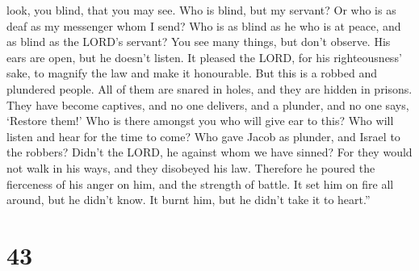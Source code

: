 look, you blind, that you may see.  Who is blind, but my
servant? Or who is as deaf as my messenger whom I send? Who is as blind
as he who is at peace, and as blind as the LORD's servant?
 You see many things, but don't observe. His ears are
open, but he doesn't listen.  It pleased the LORD, for
his righteousness' sake, to magnify the law and make it honourable.
 But this is a robbed and plundered people. All of them
are snared in holes, and they are hidden in prisons. They have become
captives, and no one delivers, and a plunder, and no one says, `Restore
them!'  Who is there amongst you who will give ear to
this? Who will listen and hear for the time to come?  Who
gave Jacob as plunder, and Israel to the robbers? Didn't the LORD, he
against whom we have sinned? For they would not walk in his ways, and
they disobeyed his law.  Therefore he poured the
fierceness of his anger on him, and the strength of battle. It set him
on fire all around, but he didn't know. It burnt him, but he didn't take
it to heart.''

\hypertarget{section-42}{%
\section{43}\label{section-42}}

